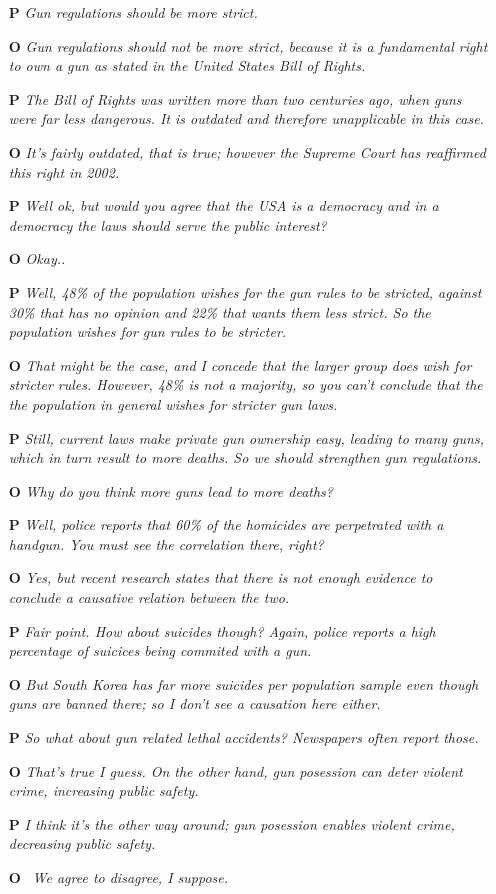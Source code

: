 \documentclass[]{article}
\begin{document}
\begin{itemize}
\item[\textbf{P}]  \textit{Gun regulations should be more strict.}
\item[\textbf{O}]  \textit{Gun regulations should not be more strict, because it is a fundamental right to own a gun as stated in the United States Bill of Rights.}
\item[\textbf{P}]  \textit{The Bill of Rights was written more than two centuries ago, when guns were far less dangerous. It is outdated and therefore unapplicable in this case.}
\item[\textbf{O}]  \textit{It's fairly outdated, that is true; however the Supreme Court has reaffirmed this right in 2002.}
\item[\textbf{P}] \textit{ Well ok, but would you agree that the USA is a democracy and in a democracy the laws should serve the public interest?}
\item[\textbf{O}]  \textit{Okay..}
\item[\textbf{P}]  \textit{Well, 48\% of the population wishes for the gun rules to be stricted, against 30\% that has no opinion and 22\% that wants them less strict. So the population wishes for gun rules to be stricter.}
\item[\textbf{O}]  \textit{That might be the case, and I concede that the larger group does wish for stricter rules. However, 48\% is not a majority, so you can't conclude that the the population in general wishes for stricter gun laws.}
\item[\textbf{P}]  \textit{Still, current laws make private gun ownership easy, leading to many guns, which in turn result to more deaths. So we should strengthen gun regulations. }
\item[\textbf{O}]  \textit{Why do you think more guns lead to more deaths?}
\item[\textbf{P}]  \textit{Well, police reports that 60\% of the homicides are perpetrated with a handgun. You must see the correlation there, right?}
\item[\textbf{O}]  \textit{Yes, but recent research states that there is not enough evidence to conclude a causative relation between the two.}
\item[\textbf{P}] \textit{Fair point. How about suicides though? Again, police reports a high percentage of suicices being commited with a gun.}
\item[\textbf{O}]  \textit{But South Korea has far more suicides per population sample even though guns are banned there; so I don't see a causation here either.}
\item[\textbf{P}]  \textit{So what about gun related lethal accidents? Newspapers often report those.}
\item[\textbf{O}]  \textit{That's true I guess. On the other hand, gun posession can deter violent crime, increasing public safety.}
\item[\textbf{P}] \textit{ I think it's the other way around; gun posession enables violent crime, decreasing public safety.}
\item[\textbf{O}]  \textit{We agree to disagree, I suppose.}
\end{itemize} 
\end{document}
